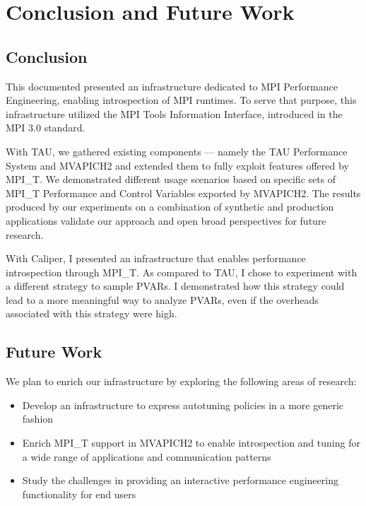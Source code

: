\chapter{Conclusion and Future Work}
\section{Conclusion}
This documented presented an infrastructure dedicated to MPI Performance Engineering, enabling introspection of MPI runtimes.
To serve that purpose, this infrastructure utilized the MPI Tools Information Interface, introduced in the MPI 3.0 standard.
\par With TAU, we gathered existing components --- namely the TAU Performance System and MVAPICH2 and extended them to fully exploit features offered by MPI\_T. We demonstrated different usage scenarios based on specific sets of MPI\_T Performance and Control Variables exported by MVAPICH2. The results produced by our experiments on a combination of synthetic and production applications validate our approach and open broad perspectives for future research.
\par With Caliper, I presented an infrastructure that enables performance introspection through MPI\_T. As compared to TAU, I chose to experiment with a different strategy to sample PVARs. I demonstrated how this strategy could lead to a more meaningful way to analyze PVARs, even if the overheads associated with this strategy were high.
\section{Future Work}
We plan to enrich our infrastructure by exploring the following areas of research:
\begin{itemize}
	\item Develop an infrastructure to express autotuning policies in a more generic fashion
        \item Enrich MPI\_T support in MVAPICH2 to enable introspection and tuning for a wide range of applications and communication patterns
	\item Study the challenges in providing an interactive performance engineering functionality for end users
\end{itemize}

